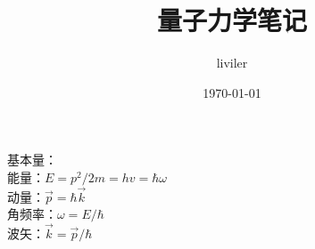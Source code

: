 \documentclass{article}
\title{量子力学笔记}
\author{liviler}
\date{\today}
\begin{document}
\maketitle
基本量：\\
能量：$E=p^2/2m =h v=\hbar \omega $\\
动量：$\vec{p}=\hbar \vec{k}$\\
角频率：$\omega=E/\hbar$\\
波矢：$\vec{k}=\vec{p}/\hbar$





                                                                                                                                                                 
\end{document}
